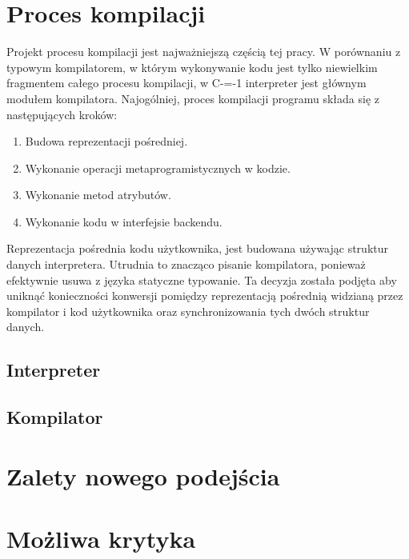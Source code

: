 \documentclass[conference]{IEEEtran}
\begin{document}
\section{Proces kompilacji}

Projekt procesu kompilacji jest najważniejszą częścią tej pracy.
W porównaniu z typowym kompilatorem, w którym wykonywanie kodu jest tylko niewielkim fragmentem całego procesu kompilacji, w C-=-1 interpreter jest głównym modułem kompilatora.
Najogólniej, proces kompilacji programu składa się z następujących kroków:
\begin{enumerate}
    \item Budowa reprezentacji pośredniej.
    \item Wykonanie operacji metaprogramistycznych w kodzie.
    \item Wykonanie metod atrybutów.
    \item Wykonanie kodu w interfejsie backendu.
\end{enumerate}

Reprezentacja pośrednia kodu użytkownika, jest budowana używając struktur danych interpretera.
Utrudnia to znacząco pisanie kompilatora, ponieważ efektywnie usuwa z języka statyczne typowanie.
Ta decyzja została podjęta aby uniknąć konieczności konwersji pomiędzy reprezentacją pośrednią widzianą przez kompilator i kod użytkownika oraz synchronizowania tych dwóch struktur danych.


\subsection{Interpreter}
\subsection{Kompilator}
\section{Zalety nowego podejścia}
\section{Możliwa krytyka}
\end{document}
